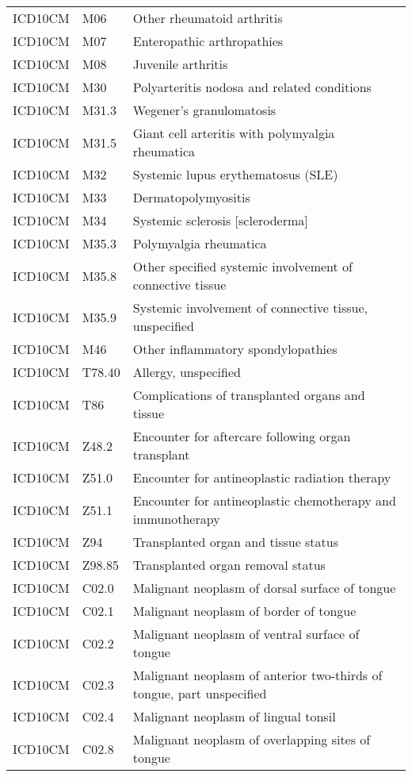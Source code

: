 \begin{longtable}{p{}p{}p{}}
  ICD10CM & M06 & Other rheumatoid arthritis \\ 
  ICD10CM & M07 & Enteropathic arthropathies \\ 
  ICD10CM & M08 & Juvenile arthritis \\ 
  ICD10CM & M30 & Polyarteritis nodosa and related conditions \\ 
  ICD10CM & M31.3 & Wegener's granulomatosis \\ 
  ICD10CM & M31.5 & Giant cell arteritis with polymyalgia rheumatica \\ 
  ICD10CM & M32 & Systemic lupus erythematosus (SLE) \\ 
  ICD10CM & M33 & Dermatopolymyositis \\ 
  ICD10CM & M34 & Systemic sclerosis [scleroderma] \\ 
  ICD10CM & M35.3 & Polymyalgia rheumatica \\ 
  ICD10CM & M35.8 & Other specified systemic involvement of connective tissue \\ 
  ICD10CM & M35.9 & Systemic involvement of connective tissue, unspecified \\ 
  ICD10CM & M46 & Other inflammatory spondylopathies \\ 
  ICD10CM & T78.40 & Allergy, unspecified \\ 
  ICD10CM & T86 & Complications of transplanted organs and tissue \\ 
  ICD10CM & Z48.2 & Encounter for aftercare following organ transplant \\ 
  ICD10CM & Z51.0 & Encounter for antineoplastic radiation therapy \\ 
  ICD10CM & Z51.1 & Encounter for antineoplastic chemotherapy and immunotherapy \\ 
  ICD10CM & Z94 & Transplanted organ and tissue status \\ 
  ICD10CM & Z98.85 & Transplanted organ removal status \\ 
  ICD10CM & C02.0 & Malignant neoplasm of dorsal surface of tongue \\ 
  ICD10CM & C02.1 & Malignant neoplasm of border of tongue \\ 
  ICD10CM & C02.2 & Malignant neoplasm of ventral surface of tongue \\ 
  ICD10CM & C02.3 & Malignant neoplasm of anterior two-thirds of tongue, part unspecified \\ 
  ICD10CM & C02.4 & Malignant neoplasm of lingual tonsil \\ 
  ICD10CM & C02.8 & Malignant neoplasm of overlapping sites of tongue \\ 

\end{longtable}
